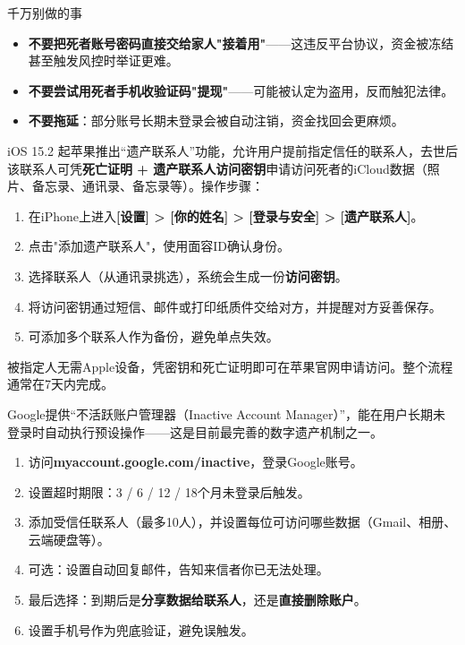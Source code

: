 \begin{tcbwarn}{千万别做的事}
\begin{itemize}
  \item \textbf{不要把死者账号密码直接交给家人"接着用"}——这违反平台协议，资金被冻结甚至触发风控时举证更难。
  \item \textbf{不要尝试用死者手机收验证码"提现"}——可能被认定为盗用，反而触犯法律。
  \item \textbf{不要拖延}：部分账号长期未登录会被自动注销，资金找回会更麻烦。
\end{itemize}

\end{tcbwarn}


iOS 15.2 起苹果推出“遗产联系人”功能，允许用户提前指定信任的联系人，去世后该联系人可凭\textbf{死亡证明 + 遗产联系人访问密钥}申请访问死者的iCloud数据（照片、备忘录、通讯录、备忘录等）。操作步骤：

\begin{enumerate}
  \item 在iPhone上进入\textbf{[设置] > [你的姓名] > [登录与安全] > [遗产联系人]}。
  \item 点击"添加遗产联系人"，使用面容ID确认身份。
  \item 选择联系人（从通讯录挑选），系统会生成一份\textbf{访问密钥}。
  \item 将访问密钥通过短信、邮件或打印纸质件交给对方，并提醒对方妥善保存。
  \item 可添加多个联系人作为备份，避免单点失效。
\end{enumerate}

被指定人无需Apple设备，凭密钥和死亡证明即可在苹果官网申请访问。整个流程通常在7天内完成。


Google提供“不活跃账户管理器（Inactive Account Manager）”，能在用户长期未登录时自动执行预设操作——这是目前最完善的数字遗产机制之一。

\begin{enumerate}
  \item 访问\textbf{myaccount.google.com/inactive}，登录Google账号。
  \item 设置超时期限：3 / 6 / 12 / 18个月未登录后触发。
  \item 添加受信任联系人（最多10人），并设置每位可访问哪些数据（Gmail、相册、云端硬盘等）。
  \item 可选：设置自动回复邮件，告知来信者你已无法处理。
  \item 最后选择：到期后是\textbf{分享数据给联系人}，还是\textbf{直接删除账户}。
  \item 设置手机号作为兜底验证，避免误触发。
\end{enumerate}

